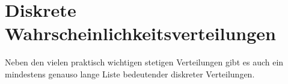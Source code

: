%
%
%
\section{Diskrete Wahrscheinlichkeitsverteilungen}
Neben den vielen praktisch wichtigen stetigen Verteilungen
gibt es auch ein mindestens genauso lange Liste bedeutender
diskreter Verteilungen.






